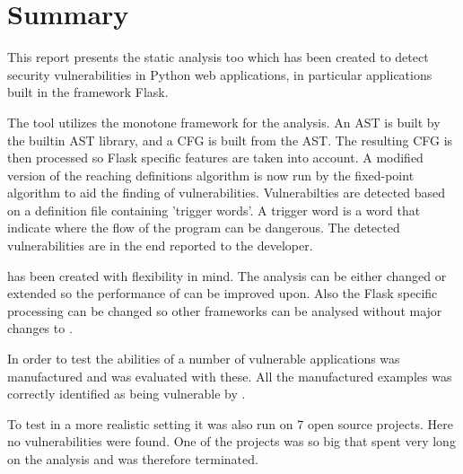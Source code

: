 \chapter*{Summary}
This report presents the static analysis too \pyt{} which has been created to detect security vulnerabilities in Python web applications, in particular applications built in the framework Flask.

The tool utilizes the monotone framework for the analysis.
An AST is built by the builtin AST library, and a CFG is built from the AST.
The resulting CFG is then processed so Flask specific features are taken into account.
A modified version of the reaching definitions algorithm is now run by the fixed-point algorithm to aid the finding of vulnerabilities.
Vulnerabilties are detected based on a definition file containing 'trigger words'.
A trigger word is a word that indicate where the flow of the program can be dangerous.
The detected vulnerabilities are in the end reported to the developer.

\pyt{} has been created with flexibility in mind.
The analysis can be either changed or extended so the performance of \pyt{} can be improved upon.
Also the Flask specific processing can be changed so other frameworks can be analysed without major changes to \pyt{}.

In order to test the abilities of \pyt{} a number of vulnerable applications was manufactured and \pyt{} was evaluated with these.
All the manufactured examples was correctly identified as being vulnerable by \pyt{}.

To test \pyt{} in a more realistic setting it was also run on 7 open source projects.
Here no vulnerabilities were found.
One of the projects was so big that \pyt{} spent very long on the analysis and was therefore terminated.

